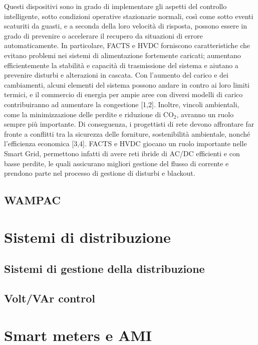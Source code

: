 Questi dispositivi sono in grado di implementare gli aspetti del controllo intelligente, sotto condizioni operative stazionarie normali, così come sotto eventi scaturiti da guasti, e a seconda della loro  velocità di risposta, possono essere in grado di prevenire o accelerare il recupero da situazioni di errore automaticamente. In particolare, FACTS e HVDC forniscono caratteristiche che evitano problemi nei sistemi di alimentazione fortemente caricati; aumentano efficientemente la stabilità e capacità di trasmissione del sistema e aiutano a prevenire disturbi e alterazioni in cascata. Con l'aumento del carico e dei cambiamenti, alcuni elementi del sistema possono andare in contro ai loro limiti termici, e il commercio di energia per ampie aree con diversi modelli di carico contribuiranno ad aumentare la congestione [1,2]. Inoltre, vincoli ambientali, come la minimizzazione delle perdite e riduzione di CO$_2$, avranno un ruolo sempre più importante. Di conseguenza, i progettisti di rete devono affrontare far fronte a conflitti tra la sicurezza delle forniture, sostenibilità ambientale, nonché l'efficienza economica [3,4].
\newline
FACTS e HVDC giocano un ruolo importante nelle Smart Grid, permettono infatti di avere reti ibride di AC/DC efficienti e con basse perdite, le quali assicurano migliori gestione del flusso di corrente e prendono parte nel processo di gestione di disturbi e blackout.

\subsection{WAMPAC}


\section{Sistemi di distribuzione}

\subsection{Sistemi di gestione della distribuzione}
\subsection{Volt/VAr control}

\section{Smart meters e AMI}


